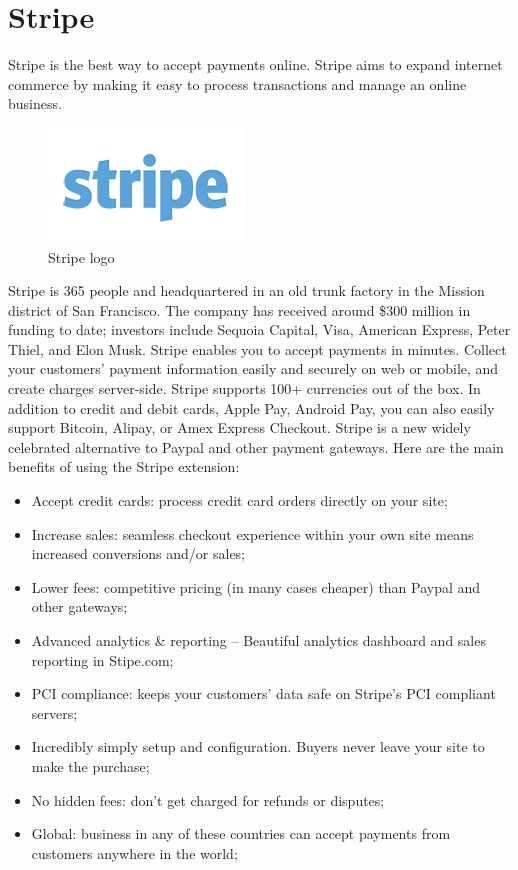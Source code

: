 \section{Stripe}
\label{sec:stripe}
Stripe is the best way to accept payments online. Stripe aims to expand internet commerce by making it easy to process transactions and manage an online business.
\begin{figure}[htb]
\centering
\includegraphics[width=0.5\linewidth]{images/chapter2/stripe-logo.png}\hfill
\caption[Stripe logo]{Stripe logo}
\label{fig:stripe_logo}
\end{figure}
Stripe is 365 people and headquartered in an old trunk factory in the Mission district of San Francisco. The company has received around \$300 million in funding to date; investors include Sequoia Capital, Visa, American Express, Peter Thiel, and Elon Musk. Stripe enables you to accept payments in minutes. Collect your customers’ payment information easily and securely on web or mobile, and create charges server-side. Stripe supports 100+ currencies out of the box. In addition to credit and debit cards, Apple Pay, Android Pay, you can also easily support Bitcoin, Alipay, or Amex Express Checkout.
Stripe is a new widely celebrated alternative to Paypal and other payment gateways. Here are the main benefits of using the Stripe extension:
\begin{itemize}
\item Accept credit cards: process credit card orders directly on your site;
\item Increase sales: seamless checkout experience within your own site means increased conversions and/or sales;
\item Lower fees: competitive pricing (in many cases cheaper) than Paypal and other gateways;
\item Advanced analytics \& reporting – Beautiful analytics dashboard and sales reporting in Stipe.com;
\item PCI compliance: keeps your customers’ data safe on Stripe’s PCI compliant servers;
\item Incredibly simply setup and configuration. Buyers never leave your site to make the purchase;
\item No hidden fees: don’t get charged for refunds or disputes;
\item Global: business in any of these countries can accept payments from customers anywhere in the world;
\end{itemize}
